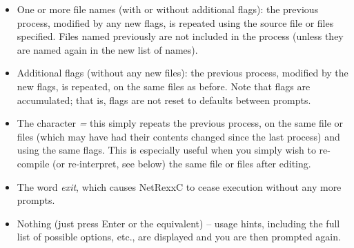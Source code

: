 \begin{itemize}
\item One or more file names (with or without additional flags): the previous
process, modified by any new flags, is repeated using the source file
or files specified.  Files named previously are not included in the
process (unless they are named again in the new list of names).
\item Additional flags (without any new files): the previous process, modified
by the new flags, is repeated, on the same files as before.
Note that flags are accumulated; that is, flags are not reset to
defaults between prompts.
\item The character \emph{=} this simply repeats the previous process,
on the same file or files (which may have had their contents changed
since the last process) and using the same flags.  This is especially
useful when you simply wish to re-compile (or re-interpret, see below)
the same file or files after editing.
\item
{}
The word \emph{exit}, which causes NetRexxC to cease execution
without any more prompts.
\item
Nothing (just press Enter or the equivalent) -- usage hints, including
the full list of possible options, etc., are displayed and you are then
prompted again.
\end{itemize}

